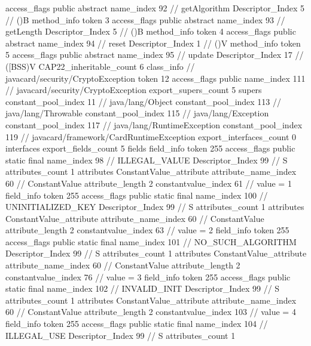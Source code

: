 {{{{{					access_flags	public abstract
					name_index	92		// getAlgorithm
					Descriptor_Index	5		// ()B
				}
				method_info {
					token	3
					access_flags	public abstract
					name_index	93		// getLength
					Descriptor_Index	5		// ()B
				}
				method_info {
					token	4
					access_flags	public abstract
					name_index	94		// reset
					Descriptor_Index	1		// ()V
				}
				method_info {
					token	5
					access_flags	public abstract
					name_index	95		// update
					Descriptor_Index	17		// ([BSS)V
				}
			}
			CAP22_inheritable_count	6
		}
		class_info {		// javacard/security/CryptoException
			token	12
			access_flags	public
			name_index	111		// javacard/security/CryptoException
			export_supers_count	5
			supers {
				constant_pool_index	11		// java/lang/Object
				constant_pool_index	113		// java/lang/Throwable
				constant_pool_index	115		// java/lang/Exception
				constant_pool_index	117		// java/lang/RuntimeException
				constant_pool_index	119		// javacard/framework/CardRuntimeException
			}
			export_interfaces_count	0
			interfaces {
			}
			export_fields_count	5
			fields {
			field_info {
				token	255
				access_flags	public static final
				name_index	98		// ILLEGAL_VALUE
				Descriptor_Index	99		// S
				attributes_count	1
				attributes {
				ConstantValue_attribute {
					attribute_name_index	60		// ConstantValue
					attribute_length	2
					constantvalue_index	61		// value = 1
				}
				}
			}
			field_info {
				token	255
				access_flags	public static final
				name_index	100		// UNINITIALIZED_KEY
				Descriptor_Index	99		// S
				attributes_count	1
				attributes {
				ConstantValue_attribute {
					attribute_name_index	60		// ConstantValue
					attribute_length	2
					constantvalue_index	63		// value = 2
				}
				}
			}
			field_info {
				token	255
				access_flags	public static final
				name_index	101		// NO_SUCH_ALGORITHM
				Descriptor_Index	99		// S
				attributes_count	1
				attributes {
				ConstantValue_attribute {
					attribute_name_index	60		// ConstantValue
					attribute_length	2
					constantvalue_index	76		// value = 3
				}
				}
			}
			field_info {
				token	255
				access_flags	public static final
				name_index	102		// INVALID_INIT
				Descriptor_Index	99		// S
				attributes_count	1
				attributes {
				ConstantValue_attribute {
					attribute_name_index	60		// ConstantValue
					attribute_length	2
					constantvalue_index	103		// value = 4
				}
				}
			}
			field_info {
				token	255
				access_flags	public static final
				name_index	104		// ILLEGAL_USE
				Descriptor_Index	99		// S
				attributes_count	1
}}}}}
